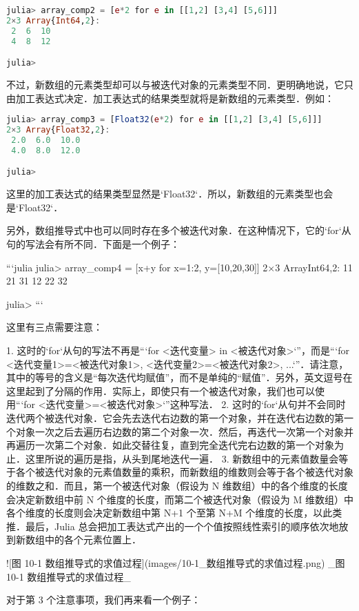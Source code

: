 \begin{lstlisting}[language=julia]
julia> array_comp2 = [e*2 for e in [[1,2] [3,4] [5,6]]]
2×3 Array{Int64,2}:
 2  6  10
 4  8  12

julia> 
\end{lstlisting}

不过，新数组的元素类型却可以与被迭代对象的元素类型不同．更明确地说，它只由加工表达式决定．加工表达式的结果类型就将是新数组的元素类型．例如：

\begin{lstlisting}[language=julia]
julia> array_comp3 = [Float32(e*2) for e in [[1,2] [3,4] [5,6]]]
2×3 Array{Float32,2}:
 2.0  6.0  10.0
 4.0  8.0  12.0

julia> 
\end{lstlisting}

这里的加工表达式的结果类型显然是`Float32`．所以，新数组的元素类型也会是`Float32`．

另外，数组推导式中也可以同时存在多个被迭代对象．在这种情况下，它的`for`从句的写法会有所不同．下面是一个例子：

```julia
julia> array_comp4 = [x+y for x=1:2, y=[10,20,30]]
2×3 Array{Int64,2}:
 11  21  31
 12  22  32

julia> 
```

这里有三点需要注意：

1. 这时的`for`从句的写法不再是“`for <迭代变量> in <被迭代对象>`”，而是“`for <迭代变量1>=<被迭代对象1>, <迭代变量2>=<被迭代对象2>, ...`”．请注意，其中的等号的含义是“每次迭代均赋值”，而不是单纯的“赋值”．另外，英文逗号在这里起到了分隔的作用．实际上，即使只有一个被迭代对象，我们也可以使用“`for <迭代变量>=<被迭代对象>`”这种写法．
2. 这时的`for`从句并不会同时迭代两个被迭代对象．它会先去迭代右边数的第一个对象，并在迭代右边数的第一个对象一次之后去遍历右边数的第二个对象一次．然后，再迭代一次第一个对象并再遍历一次第二个对象．如此交替往复，直到完全迭代完右边数的第一个对象为止．这里所说的遍历是指，从头到尾地迭代一遍．
3. 新数组中的元素值数量会等于各个被迭代对象的元素值数量的乘积，而新数组的维数则会等于各个被迭代对象的维数之和．而且，第一个被迭代对象（假设为 N 维数组）中的各个维度的长度会决定新数组中前 N 个维度的长度，而第二个被迭代对象（假设为 M 维数组）中各个维度的长度则会决定新数组中第 N+1 个至第 N+M 个维度的长度，以此类推．最后，Julia 总会把加工表达式产出的一个个值按照线性索引的顺序依次地放到新数组中的各个元素位置上．


![图 10-1 数组推导式的求值过程](images/10-1_数组推导式的求值过程.png)
_图 10-1 数组推导式的求值过程_

对于第 3 个注意事项，我们再来看一个例子：

